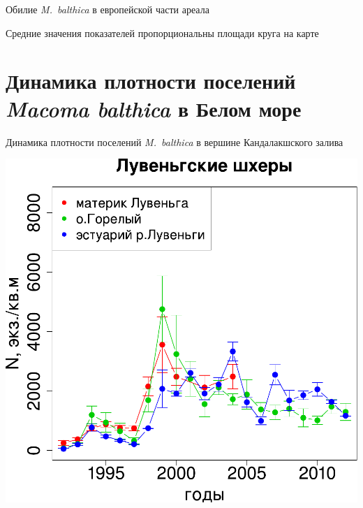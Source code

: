 \documentclass{beamer}
\begin{document}
\begin{frame}{Обилие {\it M.~balthica} в европейской части ареала}
\begin{minipage}[t]{.49\linewidth}
\begin{center}
		\end{center}
	\end{minipage}

{\tiny Средние значения показателей пропорциональны площади круга на карте}
\end{frame}



		\section[Динамика численности]{Динамика плотности поселений {\it Macoma balthica} в Белом море}
\begin{frame}{Динамика плотности поселений {\it M.~balthica} в вершине Кандалакшского залива}
	\begin{minipage}[t]{.49\linewidth}
		\begin{center}
			\includegraphics[width=\textwidth]{N2_dynamic_Luvenga_big1.pdf}
		\end{center}
	\end{minipage}
%
	\begin{minipage}[t]{.49\linewidth}
		\begin{center}

\end{center}
\end{minipage}
\end{frame}
\end{document}
